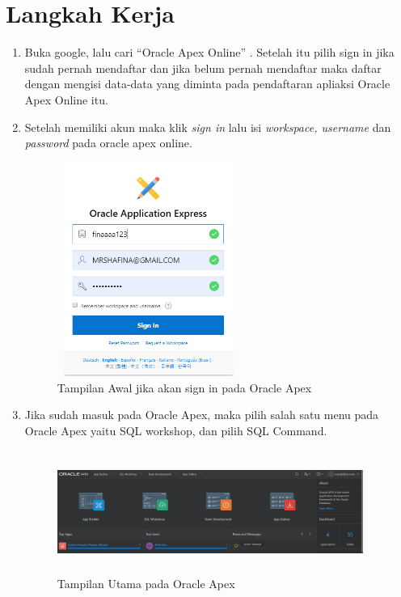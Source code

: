 \documentclass[a4paper, 12pt]{article}
\begin{document}
\section{Langkah Kerja}
\begin{enumerate}

\item Buka google, lalu cari “Oracle Apex Online” . Setelah itu pilih sign in jika sudah pernah mendaftar dan jika belum pernah mendaftar maka daftar dengan mengisi data-data yang diminta pada pendaftaran apliaksi Oracle Apex Online itu.

\item Setelah memiliki akun maka klik \textit{sign in} lalu isi \textit{workspace, username} dan \textit{password} pada oracle apex online.

            \begin{figure}[!htbp]
            \centering
            \includegraphics[width=6cm,height=7cm]{gambar/1.PNG}
            \caption{Tampilan Awal jika akan sign in pada Oracle Apex}
            \label{penanda}
            \end{figure}

\item Jika sudah masuk pada Oracle Apex, maka pilih salah satu menu pada Oracle Apex yaitu SQL workshop, dan pilih SQL Command.

            \begin{figure}[!htbp]
            \centering
            \includegraphics[width=10cm,height=4cm]{gambar/tampilanmenu.PNG}
            \caption{Tampilan Utama pada Oracle Apex}
            \label{penanda}
            \end{figure}
            

\end{enumerate}
\end{document}
